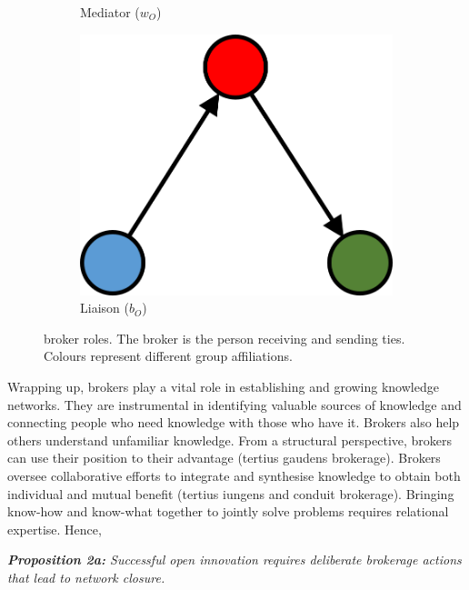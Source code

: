 \begin{figure}
\begin{subfigure}[b]{0.25\textwidth}
    \caption{Mediator ($w_O$)}
    \label{fig:4}
  \end{subfigure}
  \hspace{2em}
  \begin{subfigure}[b]{0.25\textwidth}
    \includegraphics[width=\textwidth]{Images/b_O.png}
    \caption{Liaison ($b_O$)}
    \label{fig:5}
  \end{subfigure}
  \caption[Broker roles]{\citet{gould1989structures} broker roles. The broker is the person receiving and sending ties. Colours represent different group affiliations.}%
    \label{fig:gf_roles}%
\end{figure}

Wrapping up, brokers play a vital role in establishing and growing knowledge networks. They are instrumental in identifying valuable sources of knowledge and connecting people who need knowledge with those who have it. Brokers also help others understand unfamiliar knowledge. From a structural perspective, brokers can use their position to their advantage (tertius gaudens brokerage). Brokers oversee collaborative efforts to integrate and synthesise knowledge to obtain both individual and mutual benefit (tertius iungens and conduit brokerage). Bringing know-how and know-what together to jointly solve problems requires relational expertise. Hence, \bigskip  

\begin{tcolorbox}
\textit{\textbf{Proposition 2a:} Successful open innovation requires deliberate brokerage actions that lead to network closure.}
\end{tcolorbox}

